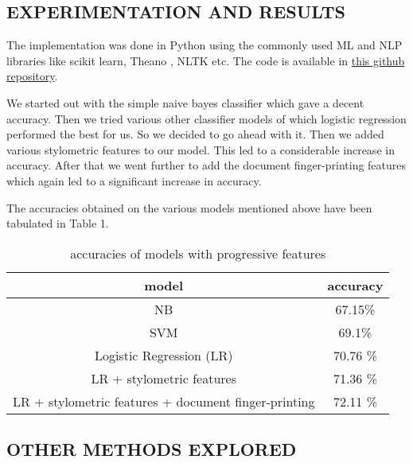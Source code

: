 \documentclass[letterpaper]{article}
\begin{document}
\subsection{EXPERIMENTATION AND RESULTS}
The implementation was done in Python using the commonly used ML and NLP libraries like scikit learn, Theano , NLTK etc. The code is available in \href{https://github.com/devanshdalal/Author-Identification-task}{this github repository}.


We started out with the simple naive bayes classifier which gave a decent accuracy. Then we tried various other classifier models of which logistic regression performed the best for us. So we decided to go ahead with it. Then we added various stylometric features to our model. This led to a considerable increase in accuracy. After that we went further to add the document finger-printing features which again led to a significant increase in accuracy.

The accuracies obtained on the various models mentioned above have been tabulated in Table 1.


\begin{table}[h!]
\centering
\begin{tabular}{||c | c||} 
 \hline
 model & accuracy \\ [0.5ex] 
 \hline\hline
 NB & 67.15\%   \\
 \hline
 SVM & 69.1\%   \\
 \hline
 Logistic Regression (LR)  & 70.76 \% \\
  \hline
 LR + stylometric features & 71.36 \% \\
 \hline
 \multicolumn{1}{||m{4cm}|}{LR + stylometric features + document finger-printing} & 72.11 \% \\
 \hline
\end{tabular}
\caption{ accuracies of models with progressive features }
\label{table:1}
\end{table}



\subsection{OTHER METHODS EXPLORED}
\end{document}
